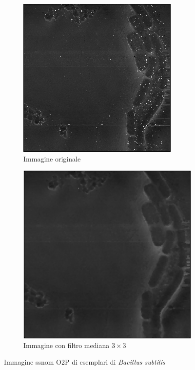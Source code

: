 \documentclass[../main.tex]{subfiles}
\begin{document}
\begin{figure}[ht]
	\centering
	\begin{subfigure}{0.4\linewidth}
		\centering
		\includegraphics[keepaspectratio, width=\linewidth]{images/bs_o2p.png}
		\caption{Immagine originale}
	\end{subfigure}
	\hspace{20pt}
	\begin{subfigure}{0.4\linewidth}
		\centering
		\includegraphics[keepaspectratio, width=\linewidth]{images/bs_o2p_medfilt.png}
		\caption{Immagine con filtro mediana $3\times3$}
	\end{subfigure}
	\caption[Immagine s-SNOM O2P di esemplari di \textit{Bacillus subtilis}]{
		Immagine \acrshort{ssnom} O2P di esemplari di \textit{Bacillus subtilis}}
\end{figure}
\end{document}
